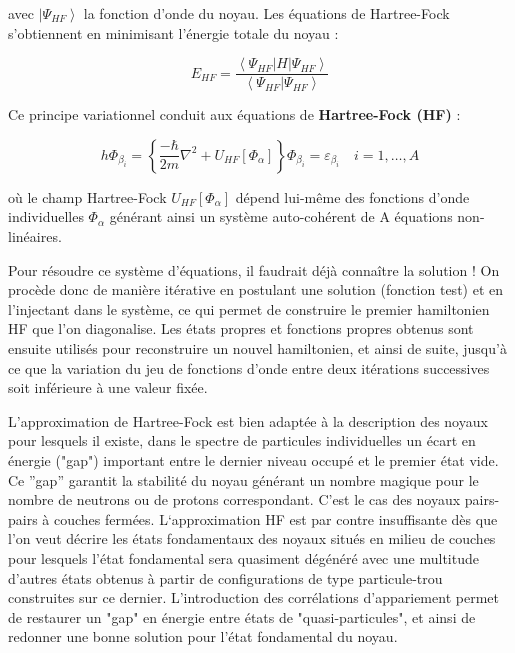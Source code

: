 avec $|\left.\Psi _{\mathit{HF}}\right\rangle $  la fonction d’onde du noyau. Les équations de Hartree-Fock s’obtiennent en minimisant l’énergie totale du noyau :

\begin{equation}E_{\mathit{HF}}=\frac{\left\langle \Psi _{\mathit{HF}}\left|H\left|\Psi _{\mathit{HF}}\right.\right.\right\rangle
}{\left\langle \Psi _{\mathit{HF}}\left|\Psi _{\mathit{HF}}\right.\right\rangle
}\end{equation}

Ce principe variationnel conduit aux équations de \textbf{Hartree-Fock (HF)}  :

\begin{equation}h\Phi _{\beta _i}=\left\{\frac{-\hbar
}{2m}{\nabla}^2+U_{\mathit{HF}}\left[\Phi _{\alpha }\right]\right\}\Phi _{\beta _i}=\varepsilon _{\beta
_i}\quad i=1,{\dots},A\end{equation}


où le champ Hartree-Fock $U_{\mathit{HF}}\left[\Phi _{\alpha }\right]$ dépend lui-même des fonctions d’onde individuelles $\Phi _{\alpha }$  générant ainsi un système auto-cohérent de A équations non-linéaires.

Pour résoudre ce système d’équations, il faudrait déjà connaître la solution ! On procède donc de manière itérative en postulant une solution (fonction test) et en l’injectant dans le système, ce qui permet de construire le premier hamiltonien HF que l’on diagonalise. Les états propres et fonctions propres obtenus sont ensuite utilisés pour reconstruire un nouvel hamiltonien, et ainsi de suite, jusqu’à ce que la variation du jeu de fonctions d’onde entre deux itérations successives soit inférieure à une valeur fixée.

L’approximation de Hartree-Fock est bien adaptée à la description des noyaux pour lesquels il existe, dans le spectre de particules individuelles un écart en énergie ("gap") important entre le dernier niveau occupé et le premier état vide. Ce ”gap” garantit la stabilité du noyau générant un nombre magique pour le nombre de neutrons ou de protons correspondant. C’est le cas des noyaux pairs-pairs à couches fermées. L‘approximation HF est par contre insuffisante dès que l’on veut décrire les états fondamentaux des noyaux situés en milieu de couches pour lesquels l’état fondamental sera quasiment dégénéré avec une multitude d’autres états obtenus à partir de configurations de type particule-trou construites sur ce dernier. L’introduction des corrélations d’appariement permet de restaurer un "gap" en énergie entre états de "quasi-particules", et ainsi de redonner une bonne solution pour l’état fondamental du noyau.

